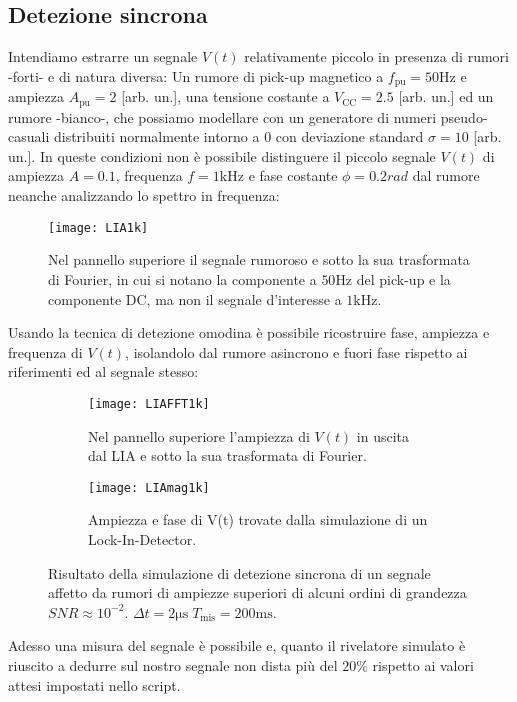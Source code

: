 \documentclass{article}[a4paper, oneside, 11pt]
\begin{document}
\subsection{Detezione sincrona}
Intendiamo estrarre un segnale $V(t)$ relativamente piccolo
in presenza di rumori -forti- e di natura diversa:
Un rumore di pick-up magnetico a $f_{\text{pu}} = 50 \si{\Hz}$ e ampiezza
$A_{\text{pu}} = 2$ [arb. un.], una tensione costante a 
$V_{\text{CC}} = 2.5$ [arb. un.] ed un rumore -bianco-, che possiamo modellare
con un generatore di numeri pseudo-casuali distribuiti normalmente
intorno a 0 con deviazione standard $\sigma = 10$ [arb. un.].
In queste condizioni non è possibile distinguere il piccolo segnale $V(t)$ 
di ampiezza $A = 0.1$, frequenza $f = 1 \si{\kilo\hertz}$ e fase costante
$\phi = 0.2 \si{rad}$ dal rumore neanche analizzando lo spettro in frequenza:
\begin{figure}[!htb]
\centering
	\texttt{[image: LIA1k]}
	\caption{Nel pannello superiore il segnale rumoroso e sotto la sua
			trasformata di Fourier, in cui si notano la componente a
			$50 \si{\Hz}$ del pick-up e la componente DC, ma non il segnale
			d'interesse a $1 \si{\kilo\hertz}$. \label{fig: LIAnoise}}
\end{figure}
Usando la tecnica di detezione omodina è possibile ricostruire fase,
ampiezza e frequenza di $V(t)$, isolandolo dal rumore asincrono e fuori
fase rispetto ai riferimenti ed al segnale stesso:
\begin{figure}[!htb]
	\centering
	\begin{subfigure}{.5\textwidth}
		\texttt{[image: LIAFFT1k]}
		\caption{Nel pannello superiore l'ampiezza di $V(t)$ in uscita dal LIA
				e sotto la sua trasformata di Fourier.}
	\end{subfigure}%
	\begin{subfigure}{.5\textwidth}
		\texttt{[image: LIAmag1k]}
		\caption{Ampiezza e fase di V(t) trovate dalla simulazione di un 
			Lock-In-Detector.}
	\end{subfigure}
	\caption{Risultato della simulazione di detezione sincrona di un segnale
			affetto da rumori di ampiezze superiori di alcuni ordini di
			grandezza $SNR \approx 10^{-2}$. $\Delta t = 2 \si{\us} \;
			T_{\text{mis}} = 200 \si{\ms}$. \label{fig: LIAall}}
\end{figure}
Adesso una misura del segnale è possibile e, quanto il rivelatore simulato è
riuscito a dedurre sul nostro segnale non dista più del $20 \%$ rispetto ai
valori attesi impostati nello script.
\end{document}
